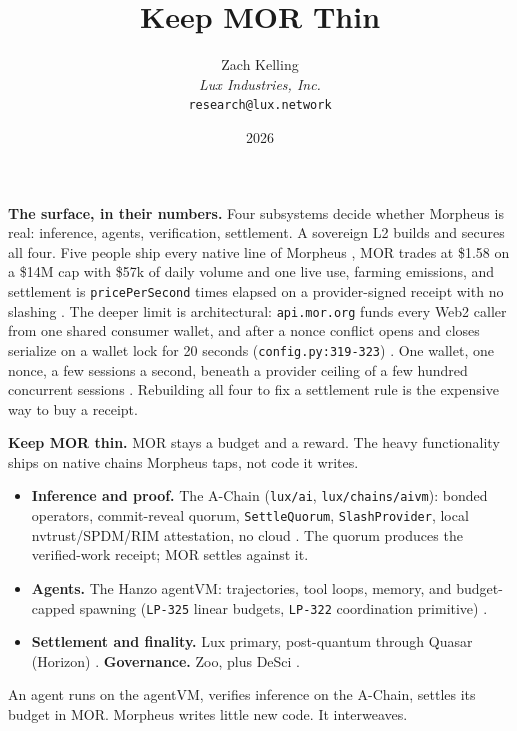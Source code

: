 \documentclass[11pt,a4paper]{article}
\title{Keep MOR Thin}
\author{Zach Kelling\\\textit{Lux Industries, Inc.}\\\texttt{research@lux.network}}
\date{2026}
\newcommand{\code}[1]{\texttt{\small #1}}
\newcommand{\prov}[1]{{\color{muted}\scriptsize\sffamily[#1]}}
\begin{document}
\luxcoverpage
\sloppy

\par
\vspace{0.8ex}
\par
\vspace{0.7ex}
\noindent{\color{rule}\rule{\linewidth}{1.1pt}}\par
\vspace{1.0ex}
\par
\vspace{0.9ex}

\noindent\textbf{The surface, in their numbers.}
Four subsystems decide whether Morpheus is real: inference, agents, verification, settlement. A
sovereign L2 builds and secures all four. Five people ship every native line of Morpheus \prov{verified},
MOR trades at \$1.58 on a \$14M cap with \$57k of daily volume and one live use, farming emissions, and
settlement is \code{pricePerSecond} times elapsed on a provider-signed receipt with no slashing
\prov{verified}. The deeper limit is
architectural: \code{api.mor.org} funds every Web2 caller from one shared consumer wallet, and after a
nonce conflict opens and closes serialize on a wallet lock for 20 seconds
(\code{config.py:319-323}) \prov{verified}. One wallet, one nonce, a few sessions a second, beneath a
provider ceiling of a few hundred concurrent sessions \prov{verified}. Rebuilding all four to fix a
settlement rule is the expensive way to buy a receipt.

\vspace{0.35ex}
\noindent\textbf{Keep MOR thin.}
MOR stays a budget and a reward. The heavy functionality ships on native chains Morpheus taps, not code it
writes.
\begin{itemize}
\item \textbf{Inference and proof.} The A-Chain (\code{lux/ai}, \code{lux/chains/aivm}): bonded operators,
      commit-reveal quorum, \code{SettleQuorum}, \code{SlashProvider}, local nvtrust/SPDM/RIM attestation,
      no cloud \prov{verified}. The quorum produces the verified-work receipt; MOR settles against it.
\item \textbf{Agents.} The Hanzo agentVM: trajectories, tool loops, memory, and budget-capped spawning
      (\code{LP-325} linear budgets, \code{LP-322} coordination primitive) \prov{verified}.
\item \textbf{Settlement and finality.} Lux primary, post-quantum through Quasar (Horizon) \prov{verified}.
      \textbf{Governance.} Zoo, plus DeSci \prov{verified}.
\end{itemize}
An agent runs on the agentVM, verifies inference on the A-Chain, settles its budget in MOR. Morpheus
writes little new code. It interweaves.
\end{document}
